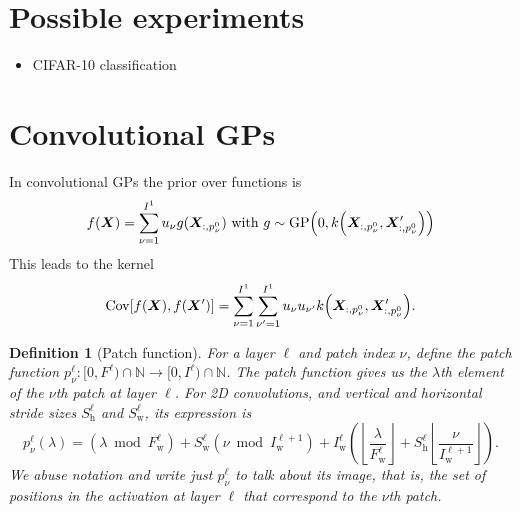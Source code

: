 \documentclass{article} %
\newcommand{\bracket}[3]{{\left#1 #3 \right#2}}
\newcommand{\bra}{\bracket{(}{)}}
\newcommand{\sqb}{\bracket{[}{]}}
\newcommand{\floor}{\bracket{\lfloor}{\rfloor}}
\newcommand{\ssup}[1]{^{#1}}
\newcommand{\GP}[1]{{\text{GP}\bra{#1}}}
\newcommand{\patch}[2]{{p\ssup{#1}_{#2}}}
\newcommand{\p}[2]{{\patch{\ell #1}{\nu #2}\bra{\lambda}}}
\newcommand{\Iw}[1]{{I\ssup{#1}_\text{w}}}
\newcommand{\Iwl}[1]{\Iw{\ell #1}}
\newcommand{\Sw}[1]{{S\ssup{#1}_\text{w}}}
\newcommand{\Swl}[1]{\Sw{\ell #1}}
\newcommand{\Sh}[1]{{S\ssup{#1}_\text{h}}}
\newcommand{\Shl}[1]{\Sh{\ell #1}}
\newcommand{\Fw}[1]{{F\ssup{#1}_\text{w}}}
\newcommand{\Fwl}[1]{\Fw{\ell #1}}
\newtheorem{definition}[theorem]{Definition}
\begin{document}
\section{Possible experiments}
\begin{itemize}
    \item CIFAR-10 classification
\end{itemize}


\section{Convolutional GPs}

In convolutional GPs \citep{markvdw2017convolutional} the prior over functions is
\begin{equation}
  f(\mX) = \sum_{\nu=1}^{I\ssup{1}} \evu_\nu g(\mX_{:, p\ssup{0}_\nu}) \text{ with } g \sim \GP{0, k\bra{\mX_{:, p\ssup{0}_\nu}, \mX'_{:, p\ssup{0}_\nu}}}
\end{equation}
This leads to the kernel 
\begin{equation}
  \Cov\sqb{f(\mX), f(\mX')} = \sum_{\nu=1}^{I\ssup{1}}\sum_{\nu'=1}^{I\ssup{1}} \evu_{\nu} \evu_{\nu'} k\bra{\mX_{:, p\ssup{0}_\nu}, \mX'_{:, p\ssup{0}_\nu}}.
\end{equation}

\begin{definition}[Patch function]
  For a layer $\ell$ and patch index $\nu$, define the patch function $p\ssup{\ell}_\nu: [0, F\ssup{\ell})
  \cap \mathbb{N} \to [0, I\ssup{\ell}) \cap \mathbb{N}$.
  The patch function gives us the $\lambda$th element of the $\nu$th patch at layer
  $\ell$. For 2D convolutions, and vertical and horizontal stride sizes $\Shl{}$ and $\Swl{}$,
  its expression is
  \begin{equation}
    \p{}{}{}
    = \bra{\lambda \bmod \Fwl{}} + \Swl{}\bra{\nu\bmod \Iwl{+1}}
    + \Iwl{}\bra{\floor{\frac{\lambda}{\Fwl{}}} + \Shl{} \floor{\frac{\nu}{\Iwl{+1}}}}.
  \end{equation}
  We abuse notation and write just $p\ssup{\ell}_\nu$ to talk about its image, that is,
  the set of positions in the activation at layer $\ell$ that correspond to the $\nu$th patch.
  \label{def:patch-function}
\end{definition}
\end{document}
